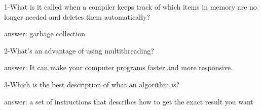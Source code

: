 1-What is it called when a compiler keeps track of which items in memory are no longer needed and deletes them automatically?


answer: garbage collection

2-What's an advantage of using multithreading?


answer: It can make your computer programs faster and more responsive.

3-Which is the best description of what an algorithm is?


answer: a set of instructions that describes how to get the exact result you want

